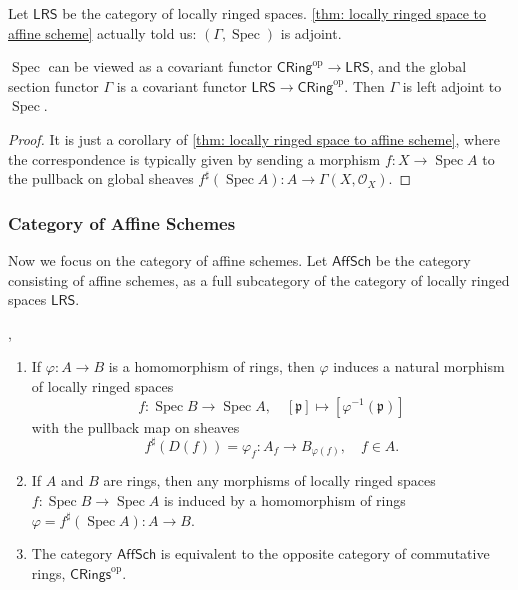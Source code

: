 \documentclass[11pt]{article}
\newcommand{\Spec}{\operatorname{Spec}}
\begin{document}
Let $ \mathsf{LRS} $ be the category of locally ringed spaces. 
\autoref{thm: locally ringed space to affine scheme} actually told us: 
$ (\Gamma,\Spec) $ is adjoint. 

\begin{theorem}
    \label{thm: adjoint Spec}
    \cite[Exercise II.2.4]{hartsAG}
    $ \Spec $ can be viewed as a covariant functor $ \mathsf{CRing}^{\operatorname{op}} \to \mathsf{LRS}$, 
    and the global section functor $ \Gamma $ is a covariant functor 
    $ \mathsf{LRS} \to \mathsf{CRing}^{\operatorname{op}} $. 
    Then $ \Gamma $ is left adjoint to $ \Spec $. 
\end{theorem}

\begin{proof}
    It is just a corollary of \autoref{thm: locally ringed space to affine scheme}, 
    where the correspondence is typically given by sending a morphism $ f: X \to \Spec A $ to 
    the pullback on global sheaves $ f^{\sharp}(\Spec A): A \to \Gamma(X,\mathscr{O}_{X}) $. 
\end{proof}

\subsubsection{Category of Affine Schemes}

Now we focus on the category of affine schemes. 
Let $ \mathsf{AffSch} $ be the category consisting of affine schemes, as a full subcategory 
of the category of locally ringed spaces $ \mathsf{LRS} $. 

\begin{corollary}
    \label{cor: duality between affine schemes and rings}
    \cite[Proposition II.2.3]{hartsAG}, \cite[Exercise 7.3 E]{vakilTheRisingSea}
    \begin{enumerate}[label = (\alph*)]
        \item If $ \varphi:A \to B $ is a homomorphism of rings, then $ \varphi $ induces a natural 
        morphism of locally ringed spaces 
        $$ f: \Spec B \to \Spec A, \quad [\mathfrak{p}] \mapsto [\varphi^{-1}(\mathfrak{p})] $$ 
        with the pullback map on sheaves 
        $$ f^{\sharp}(D(f))=\varphi_{f}: A_{f} \to B_{\varphi(f)}, \quad f \in A. $$

        \item If $ A $ and $ B $ are rings, then any morphisms of locally ringed spaces $f: \Spec B \to \Spec A$ 
        is induced by a homomorphism of rings $ \varphi=f^{\sharp}(\Spec A):A \to B $. 

        \item The category $ \mathsf{AffSch} $ is equivalent to the opposite category 
        of commutative rings, $ \mathsf{CRings}^{\operatorname{op}} $. 
    \end{enumerate}
\end{corollary}
\end{document}

